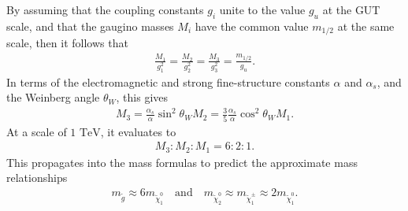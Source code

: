 \documentclass[twoside,english]{uiofysmaster}
\begin{document}
 By assuming that the coupling constants $g_i$ unite to the value $g_u$ at the GUT scale, and that the gaugino masses $M_i$ have the common value $m_{1/2}$ at the same scale, then it follows that
 \begin{align}
 	\frac{M_1}{g_1^2} = \frac{M_2}{g_2^2} = \frac{M_3}{g_3^2} = \frac{m_{1/2}}{g_u}.
 \end{align}
 In terms of the electromagnetic and strong fine-structure constants $\alpha$ and $\alpha_s$, and the Weinberg angle $\theta_W$, this gives
 \begin{align}
 	M_3 = \frac{\alpha_s}{\alpha}\sin^2\theta_W M_2 = \frac{3}{5}\frac{\alpha_s}{\alpha} \cos^2\theta_W M_1.
 \end{align}
 At a scale of $1 \,\, \mathrm{TeV}$, it evaluates to 
 \begin{align}
 	M_3 : M_2 : M_1 = 6 : 2 : 1.
 \end{align}
 This propagates into the mass formulas to predict the approximate mass relationships
 \begin{align}
 	m_{\tilde g} \approx 6m_{\tilde \chi_1^0} \quad \mathrm{and} \quad m_{\tilde \chi_2^0} \approx m_{\tilde \chi_1^\pm} \approx 2m_{\tilde \chi_1^0}.
 \end{align}
\end{document}
